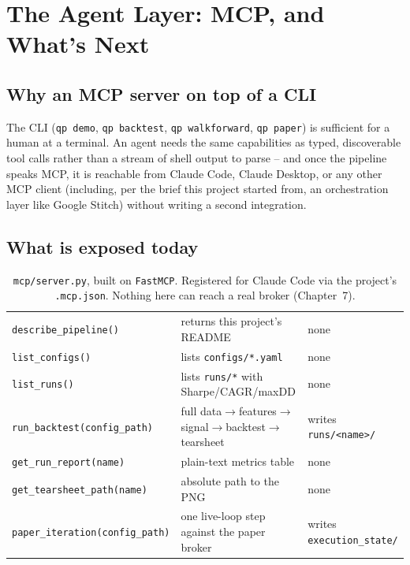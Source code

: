 \chapter{The Agent Layer: MCP, and What's Next}

\section{Why an MCP server on top of a CLI}

The CLI (\texttt{qp demo}, \texttt{qp backtest}, \texttt{qp walkforward}, \texttt{qp
paper}) is sufficient for a human at a terminal. An agent needs the same
capabilities as typed, discoverable tool calls rather than a stream of shell
output to parse -- and once the pipeline speaks MCP, it is reachable from
Claude Code, Claude Desktop, or any other MCP client (including, per the brief
this project started from, an orchestration layer like Google Stitch) without
writing a second integration.

\section{What is exposed today}

\begin{table}[h]
\footnotesize
\centering
\begin{tabularx}{\textwidth}{L{4.6cm} X L{2.6cm}}
\toprule
{} &  &  \\
\midrule
\texttt{describe\_pipeline()} & returns this project's README & none \\
\texttt{list\_configs()} & lists \texttt{configs/*.yaml} & none \\
\texttt{list\_runs()} & lists \texttt{runs/*} with Sharpe/CAGR/maxDD & none \\
\texttt{run\_backtest(config\_path)} & full data$\to$features$\to$signal$\to$backtest$\to$tearsheet & writes \texttt{runs/<name>/} \\
\texttt{get\_run\_report(name)} & plain-text metrics table & none \\
\texttt{get\_tearsheet\_path(name)} & absolute path to the PNG & none \\
\texttt{paper\_iteration(config\_path)} & one live-loop step against the paper broker & writes \texttt{execution\_state/} \\
\bottomrule
\end{tabularx}
\caption{\texttt{mcp/server.py}, built on \texttt{FastMCP}. Registered for Claude
Code via the project's \texttt{.mcp.json}. Nothing here can reach a real broker
(Chapter~7).}
\end{table}

